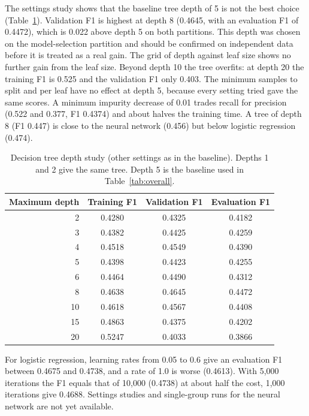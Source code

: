 \documentclass[runningheads]{llncs}
\newcommand{\tablefont}{\scriptsize\setlength{\tabcolsep}{3pt}}
\begin{document}
The settings study shows that the baseline tree depth of 5 is not the best choice (Table~\ref{tab:depth}). Validation F1 is highest at depth 8 (0.4645, with an evaluation F1 of 0.4472), which is 0.022 above depth 5 on both partitions. This depth was chosen on the model-selection partition and should be confirmed on independent data before it is treated as a real gain. The grid of depth against leaf size shows no further gain from the leaf size. Beyond depth 10 the tree overfits: at depth 20 the training F1 is 0.525 and the validation F1 only 0.403. The minimum samples to split and per leaf have no effect at depth 5, because every setting tried gave the same scores. A minimum impurity decrease of 0.01 trades recall for precision (0.522 and 0.377, F1 0.4374) and about halves the training time. A tree of depth 8 (F1 0.447) is close to the neural network (0.456) but below logistic regression (0.474). 

\begin{table}[t]
\centering
\caption{Decision tree depth study (other settings as in the baseline). Depths 1 and 2 give the same tree. Depth 5 is the baseline used in Table~\ref{tab:overall}.}
\label{tab:depth}
\tablefont
\begin{tabular}{rccc}
\toprule
\textbf{Maximum depth} & \textbf{Training F1} & \textbf{Validation F1} & \textbf{Evaluation F1} \\
\midrule
2 & 0.4280 & 0.4325 & 0.4182 \\
3 & 0.4382 & 0.4425 & 0.4259 \\
4 & 0.4518 & 0.4549 & 0.4390 \\
5 & 0.4398 & 0.4423 & 0.4255 \\
6 & 0.4464 & 0.4490 & 0.4312 \\
8 & 0.4638 & 0.4645 & 0.4472 \\
10 & 0.4618 & 0.4567 & 0.4408 \\
15 & 0.4863 & 0.4375 & 0.4202 \\
20 & 0.5247 & 0.4033 & 0.3866 \\
\bottomrule
\end{tabular}
\end{table}

For logistic regression, learning rates from 0.05 to 0.6 give an evaluation F1 between 0.4675 and 0.4738, and a rate of 1.0 is worse (0.4613). With 5,000 iterations the F1 equals that of 10,000 (0.4738) at about half the cost, 1,000 iterations give 0.4688. Settings studies and single-group runs for the neural network are not yet available.
\end{document}

